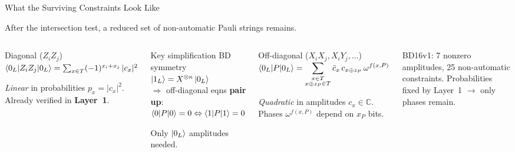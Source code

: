 \documentclass[aspectratio=169,t,10pt]{beamer}
\newcommand{\CC}{\mathbb{C}}
\begin{document}
\begin{frame}{What the Surviving Constraints Look Like}

After the intersection test, a reduced set of non-automatic Pauli strings remains.

\begin{columns}[T]
\begin{block}{Diagonal ($Z_iZ_j$)}
$\braket{0_L|Z_iZ_j|0_L} = \sum_{x \in T} (-1)^{x_i+x_j}\,|c_x|^2$

\emph{Linear} in probabilities $p_x = |c_x|^2$.\\
Already verified in \textbf{Layer~1}.
\end{block}

\begin{exampleblock}{Key simplification}
BD symmetry $\ket{1_L} = X^{\otimes n}\ket{0_L}$\\
$\Rightarrow$ off-diagonal eqns \textbf{pair up}:\\
$\braket{0|P|0} = 0 \Leftrightarrow \braket{1|P|1} = 0$

Only $\ket{0_L}$ amplitudes needed.
\end{exampleblock}

\begin{alertblock}{Off-diagonal ($X_iX_j, X_iY_j, \ldots$)}
$\braket{0_L|P|0_L} = \displaystyle\sum_{\substack{x \in T \\ x \oplus z_P \in T}}
  \bar{c}_x\, c_{x \oplus z_P}\, \omega^{f(x,P)}$

\emph{Quadratic} in amplitudes $c_x \in \CC$.\\
Phases $\omega^{f(x,P)}$ depend on $x_P$ bits.
\end{alertblock}

\textcolor{Slate}{\small BD16v1: 7 nonzero amplitudes, 25 non-automatic constraints. Probabilities fixed by Layer~1 $\to$ only phases remain.}
\end{columns}
\end{frame}
\end{document}
